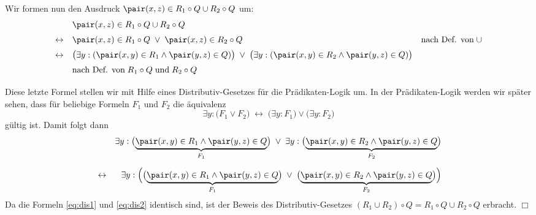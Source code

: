 Wir formen nun den Ausdruck $\pair(x,z) \in R_1 \circ Q \cup R_2 \circ Q$ um:
\[
\begin{array}{cll}
                & \pair(x,z) \in R_1 \circ Q \cup R_2 \circ Q \\[0.2cm]
\leftrightarrow & \pair(x,z) \in R_1 \circ Q \;\vee\; \pair(x,z) \in R_2 \circ Q &
                  \mbox{nach Def. von}\;\cup \\[0.2cm]
\leftrightarrow & \bigl(\exists y: (\pair(x,y) \in R_1 \wedge \pair(y,z) \in Q)\bigr) \;\vee\; 
                  \bigl(\exists y: (\pair(x,y) \in R_2 \wedge \pair(y,z) \in Q)\bigr) \\[0.2cm]
                & \mbox{nach Def. von}\; R_1 \circ Q \; \mbox{und}\; R_2 \circ Q \\[0.2cm]
\end{array}
\]
Diese letzte Formel stellen wir mit Hilfe eines Distributiv-Gesetzes f\"{u}r die
Pr\"{a}dikaten-Logik um.  In der Pr\"{a}dikaten-Logik werden wir sp\"{a}ter sehen, dass f\"{u}r beliebige
Formeln $F_1$ und $F_2$ die \"{a}quivalenz
\[ \exists y: \bigl(F_1 \vee F_2\bigr) \;\leftrightarrow\; \bigl(\exists y: F_1\bigr) \vee \bigl(\exists y: F_2\bigr) \]
g\"{u}ltig ist.  Damit folgt dann
\begin{eqnarray}
\nonumber
 & & \exists y: \bigl(\underbrace{\pair(x,y) \in R_1 \wedge \pair(y,z) \in Q}_{F_1}\bigr) \;\vee\; 
     \exists y: \bigl(\underbrace{\pair(x,y) \in R_2 \wedge \pair(y,z) \in Q}_{F_2}\bigr) \\[0.2cm]
  \label{eq:dis2}
 & \leftrightarrow &
     \exists y: \Bigl(\bigl(\underbrace{\pair(x,y) \in R_1 \wedge \pair(y,z) \in Q}_{F_1}\bigr) \;\vee\; 
                \bigl(\underbrace{\pair(x,y) \in R_2 \wedge \pair(y,z) \in Q}_{F_2}\bigr)\Bigr) 
\end{eqnarray}
Da die Formeln \ref{eq:dis1} und \ref{eq:dis2} identisch sind, ist der Beweis des
Distributiv-Gesetzes $(R_1 \cup R_2) \circ Q = R_1 \circ Q \cup R_2 \circ Q$
erbracht. \hspace*{\fill} $\Box$


